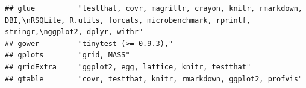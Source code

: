 \documentclass[]{article}
\begin{document}
\begin{verbatim}
## glue          "testthat, covr, magrittr, crayon, knitr, rmarkdown, DBI,\nRSQLite, R.utils, forcats, microbenchmark, rprintf, stringr,\nggplot2, dplyr, withr"                                                                                                                                                                                                                                                                                                                                                                                                                                           
## gower         "tinytest (>= 0.9.3),"                                                                                                                                                                                                                                                                                                                                                                                                                                                                                                                                                                    
## gplots        "grid, MASS"                                                                                                                                                                                                                                                                                                                                                                                                                                                                                                                                                                              
## gridExtra     "ggplot2, egg, lattice, knitr, testthat"                                                                                                                                                                                                                                                                                                                                                                                                                                                                                                                                                  
## gtable        "covr, testthat, knitr, rmarkdown, ggplot2, profvis"                                                                                                                                                                                                                                                                                                                                                                                                                                                                                                                                      

\end{verbatim}
\end{document}
